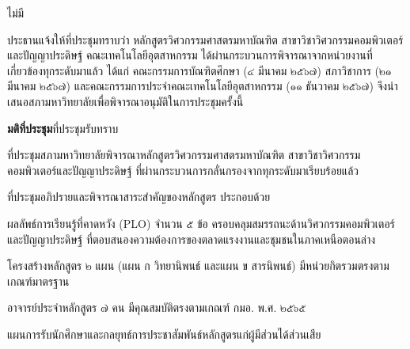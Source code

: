 \documentclass{meetingminutes}
\begin{document}
\maketitle

\begin{participants}
\end{participants}

\noindent ไม่มี\par

\startmeeting
{}


ประธานแจ้งให้ที่ประชุมทราบว่า หลักสูตรวิศวกรรมศาสตรมหาบัณฑิต สาขาวิชาวิศวกรรมคอมพิวเตอร์และปัญญาประดิษฐ์
คณะเทคโนโลยีอุตสาหกรรม ได้ผ่านกระบวนการพิจารณาจากหน่วยงานที่เกี่ยวข้องทุกระดับมาแล้ว ได้แก่
คณะกรรมการบัณฑิตศึกษา (๔ มีนาคม ๒๕๖๗) สภาวิชาการ (๒๑ มีนาคม ๒๕๖๗)
และคณะกรรมการประจำคณะเทคโนโลยีอุตสาหกรรม (๑๑ ธันวาคม ๒๕๖๗)
จึงนำเสนอสภามหาวิทยาลัยเพื่อพิจารณาอนุมัติในการประชุมครั้งนี้

\noindent\textbf{มติที่ประชุม}\quad ที่ประชุมรับทราบ


ที่ประชุมสภามหาวิทยาลัยพิจารณาหลักสูตรวิศวกรรมศาสตรมหาบัณฑิต สาขาวิชาวิศวกรรมคอมพิวเตอร์และปัญญาประดิษฐ์
ที่ผ่านกระบวนการกลั่นกรองจากทุกระดับมาเรียบร้อยแล้ว

ที่ประชุมอภิปรายและพิจารณาสาระสำคัญของหลักสูตร ประกอบด้วย

\begin{thailist}
  \item ผลลัพธ์การเรียนรู้ที่คาดหวัง (PLO) จำนวน ๕ ข้อ ครอบคลุมสมรรถนะด้านวิศวกรรมคอมพิวเตอร์และปัญญาประดิษฐ์
  ที่ตอบสนองความต้องการของตลาดแรงงานและชุมชนในภาคเหนือตอนล่าง
  \item โครงสร้างหลักสูตร ๒ แผน (แผน ก วิทยานิพนธ์ และแผน ข สารนิพนธ์)
  มีหน่วยกิตรวมตรงตามเกณฑ์มาตรฐาน
  \item อาจารย์ประจำหลักสูตร ๗ คน มีคุณสมบัติตรงตามเกณฑ์ กมอ. พ.ศ. ๒๕๖๕
  \item แผนการรับนักศึกษาและกลยุทธ์การประชาสัมพันธ์หลักสูตรแก่ผู้มีส่วนได้ส่วนเสีย
\end{thailist}
\end{document}

